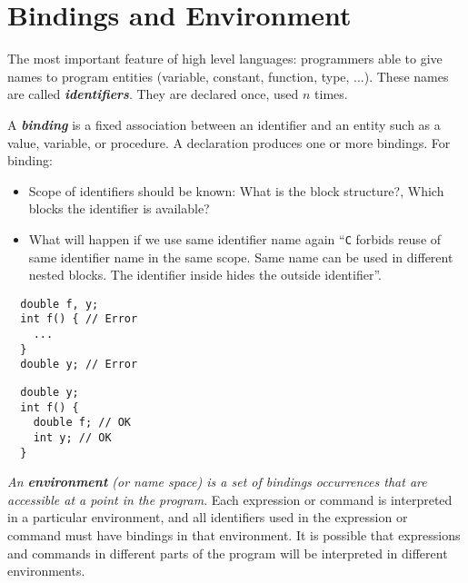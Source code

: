 \section{Bindings and Environment}
\label{sec:bind-env}

The most important feature of high level languages: programmers able to give names to program entities (variable, constant, function, type, ...). These names are called \textit{\textbf{identifiers}}. They are declared once, used $n$ times.

A \textit{\textbf{binding}} is a fixed association between an identifier and an entity such as a value, variable, or procedure. A declaration produces one or more bindings. For binding:
\begin{itemize}
  \item Scope of identifiers should be known: What is the block structure?, Which blocks the identifier is available?
  \item What will happen if we use same identifier name again ``\texttt{C} forbids reuse of same identifier name in the same scope. Same name can be used in different nested blocks. The identifier inside hides the outside identifier''.
\end{itemize}

\setlength{\columnsep}{0.2cm}
\setlength{\columnseprule}{0pt}
\begin{multicols*}{2}
\begin{listing}[H]
\begin{verbatim}
  double f, y;
  int f() { // Error
    ...
  }
  double y; // Error
\end{verbatim}
\caption{}
\label{code:code1}
\end{listing}

\columnbreak

\begin{listing}[H]
\begin{verbatim}
  double y;
  int f() {
    double f; // OK
    int y; // OK 
  }
\end{verbatim}
\caption{}
\label{code:code2}
\end{listing}
\end{multicols*}
\setlength{\columnseprule}{0.2pt}
\setlength{\columnsep}{1.5cm}

\textit{An \textbf{environment} (or name space) is a set of bindings occurrences that are accessible at a point in the program}. Each expression or command is interpreted in a particular environment, and all identifiers used in the expression or command must have bindings in that environment. It is possible that expressions and commands in different parts of the program will be interpreted in different environments.

